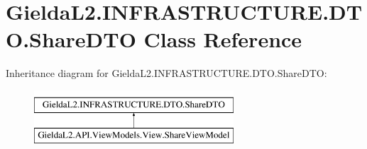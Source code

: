 \hypertarget{class_gielda_l2_1_1_i_n_f_r_a_s_t_r_u_c_t_u_r_e_1_1_d_t_o_1_1_share_d_t_o}{}\section{Gielda\+L2.\+I\+N\+F\+R\+A\+S\+T\+R\+U\+C\+T\+U\+R\+E.\+D\+T\+O.\+Share\+D\+TO Class Reference}
\label{class_gielda_l2_1_1_i_n_f_r_a_s_t_r_u_c_t_u_r_e_1_1_d_t_o_1_1_share_d_t_o}
Inheritance diagram for Gielda\+L2.\+I\+N\+F\+R\+A\+S\+T\+R\+U\+C\+T\+U\+R\+E.\+D\+T\+O.\+Share\+D\+TO\+:\begin{figure}[H]
\begin{center}
\leavevmode
\includegraphics[height=2.000000cm]{class_gielda_l2_1_1_i_n_f_r_a_s_t_r_u_c_t_u_r_e_1_1_d_t_o_1_1_share_d_t_o}
\end{center}
\end{figure}
